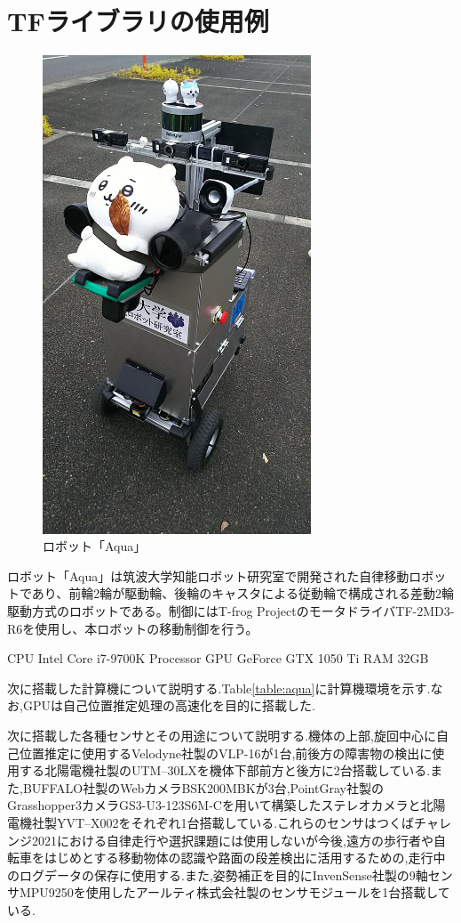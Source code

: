 \documentclass[a4paper]{jreport}	%
\begin{document}
\section{TFライブラリの使用例}

\begin{figure}[h] 
\centering
\includegraphics[width=8cm]{aqua.jpeg}	
\caption{ロボット「Aqua」}
\label{fig:aqua}
\end{figure}

ロボット「Aqua」は筑波大学知能ロボット研究室で開発された自律移動ロボットであり、前輪2輪が駆動輪、後輪のキャスタによる従動輪で構成される差動2輪駆動方式のロボットである。制御にはT-frog ProjectのモータドライバTF-2MD3-R6を使用し、本ロボットの移動制御を行う。




 CPU  Intel Core i7-9700K Processor
        GPU  GeForce GTX 1050 Ti 
        RAM  32GB 
        
        

次に搭載した計算機について説明する.Table\ref{table:aqua}に計算機環境を示す.なお,GPUは自己位置推定処理の高速化を目的に搭載した.

次に搭載した各種センサとその用途について説明する.機体の上部,旋回中心に自己位置推定に使用するVelodyne社製のVLP-16が1台,前後方の障害物の検出に使用する北陽電機社製のUTM--30LXを機体下部前方と後方に2台搭載している.また,BUFFALO社製のWebカメラBSK200MBKが3台,PointGray社製のGrasshopper3カメラGS3-U3-123S6M-Cを用いて構築したステレオカメラと北陽電機社製YVT--X002をそれぞれ1台搭載している.これらのセンサはつくばチャレンジ2021における自律走行や選択課題には使用しないが今後,遠方の歩行者や自転車をはじめとする移動物体の認識や路面の段差検出に活用するための,走行中のログデータの保存に使用する.また,姿勢補正を目的にInvenSense社製の9軸センサMPU9250を使用したアールティ株式会社製のセンサモジュールを1台搭載している.
\end{document}
